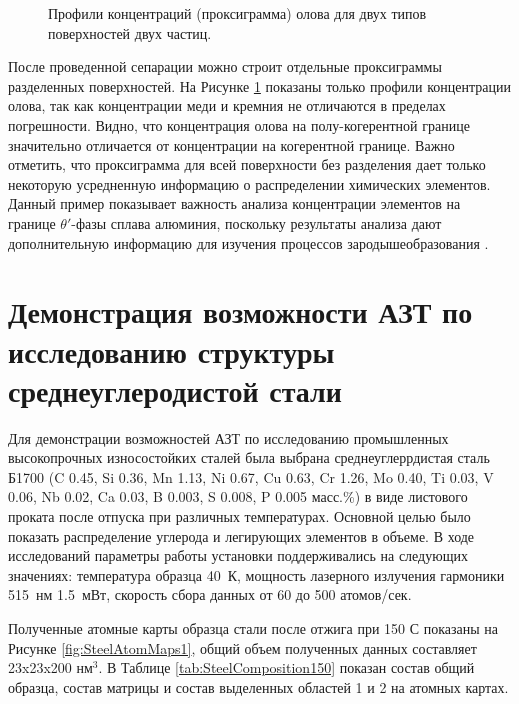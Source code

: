 \begin{figure}[htb]
	\caption{Профили концентраций (проксиграмма) олова для двух типов поверхностей двух частиц.}
	\label{fig:AlCu_Sn_proxy}
\end{figure}

\FloatBarrier

После проведенной сепарации можно строит отдельные проксиграммы разделенных поверхностей. На Рисунке \cref{fig:AlCu_Sn_proxy} показаны только профили концентрации олова, так как концентрации меди и кремния не отличаются в пределах погрешности. Видно, что концентрация олова на полу-когерентной границе значительно отличается от концентрации на когерентной границе. Важно отметить, что проксиграмма для всей поверхности без разделения дает только некоторую усредненную информацию о распределении химических элементов. Данный пример показывает важность анализа концентрации элементов на границе $\theta '$-фазы сплава алюминия, поскольку результаты анализа дают дополнительную информацию для изучения процессов зародышеобразования \cite{Akopyan2022A319}.





\FloatBarrier

\section{Демонстрация возможности АЗТ по исследованию структуры среднеуглеродистой стали}\label{sec:ch4/sect2}

Для демонстрации возможностей АЗТ по исследованию промышленных высокопрочных износостойких сталей была выбрана среднеуглеррдистая сталь Б1700 (C 0.45, Si 0.36, Mn 1.13, Ni 0.67, Cu 0.63, Cr 1.26, Mo 0.40, Ti 0.03, V 0.06, Nb 0.02, Ca 0.03, B 0.003, S 0.008, P 0.005 масс.\%) в виде листового проката после отпуска при различных температурах. Основной целью было показать распределение углерода и легирующих элементов в объеме. В ходе исследований параметры работы установки поддерживались на следующих значениях: температура образца 40~К, мощность лазерного излучения гармоники 515~нм 1.5~мВт, скорость сбора данных от 60 до 500 атомов/сек.

Полученные атомные карты образца стали после отжига при 150 \textdegree С показаны на Рисунке \cref{fig:SteelAtomMaps1}, общий объем полученных данных составляет 23x23x200 нм$^{3}$. В Таблице \cref{tab:SteelComposition150} показан состав общий образца, состав матрицы и состав выделенных областей 1 и 2 на атомных картах.

